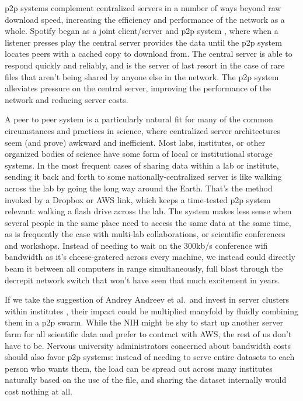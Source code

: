 p2p systems complement centralized servers in a number of ways beyond
raw download speed, increasing the efficiency and performance of the
network as a whole. Spotify began as a joint client/server and p2p
system \citep{kreitzSpotifyLargeScale2010b} , where when a
listener presses play the central server provides the data until the p2p
system locates peers with a cached copy to download from. The central
server is able to respond quickly and reliably, and is the server of
last resort in the case of rare files that aren't being shared by anyone
else in the network. The p2p system alleviates pressure on the central
server, improving the performance of the network and reducing server
costs.

A peer to peer system is a particularly natural fit for many of the
common circumstances and practices in science, where centralized server
architectures seem (and prove) awkward and inefficient. Most labs,
institutes, or other organized bodies of science have some form of local
or institutional storage systems. In the most frequent cases of sharing
data within a lab or institute, sending it back and forth to some
nationally-centralized server is like walking across the lab by going
the long way around the Earth. That's the method invoked by a Dropbox or
AWS link, which keeps a time-tested p2p system relevant: walking a flash
drive across the lab. The system makes less sense when several people in
the same place need to access the same data at the same time, as is
frequently the case with multi-lab collaborations, or scientific
conferences and workshops. Instead of needing to wait on the 300kb/s
conference wifi bandwidth as it's cheese-gratered across every machine,
we instead could directly beam it between all computers in range
simultaneously, full blast through the decrepit network switch that
won't have seen that much excitement in years.

If we take the suggestion of Andrey Andreev et al.~and invest in server
clusters within institutes \citep{andreevBiologistsNeedModern2021, charlesCommunityDrivenBigOpen2020} , their impact could be multiplied
manyfold by fluidly combining them in a p2p swarm. While the NIH might
be shy to start up another server farm for all scientific data and
prefer to contract with AWS, the rest of us don't have to be. Nervous
university administrators concerned about bandwidth costs should also
favor p2p systems: instead of needing to serve entire datasets to each
person who wants them, the load can be spread out across many institutes
naturally based on the use of the file, and sharing the dataset
internally would cost nothing at all.

